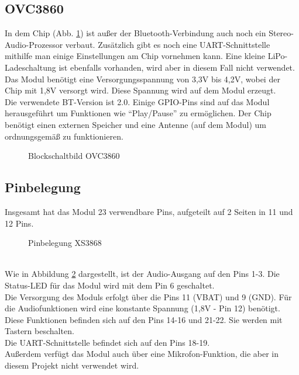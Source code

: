 \subsection{OVC3860}
In dem Chip (Abb. \ref {fig:abb2.1}) ist außer der Bluetooth-Verbindung auch noch ein Stereo-Audio-Prozessor verbaut. Zusätzlich gibt es noch eine UART-Schnittstelle mithilfe man einige Einstellungen am Chip vornehmen kann. Eine kleine LiPo-Ladeschaltung ist ebenfalls vorhanden, wird aber in diesem Fall nicht verwendet.\\
Das Modul benötigt eine Versorgungsspannung von 3,3V bis 4,2V, wobei der Chip mit 1,8V versorgt wird. Diese Spannung wird auf dem Modul erzeugt.\\
Die verwendete BT-Version ist 2.0. Einige GPIO-Pins sind auf das Modul herausgeführt um Funktionen wie \enquote{Play/Pause} zu ermöglichen. Der Chip benötigt einen externen Speicher und eine Antenne (auf dem Modul) um ordnungsgemäß zu funktionieren.
\begin{figure} [h]
	\centering
	\caption{Blockschaltbild OVC3860}\label {fig:abb2.1}
\end{figure}


\subsection{Pinbelegung}
Insgesamt hat das Modul 23 verwendbare Pins, aufgeteilt auf 2 Seiten in 11 und 12 Pins.
\begin{figure} [h]
	\centering
	\caption{Pinbelegung XS3868}\label {fig:abb2.2}
\end{figure}\\
Wie in Abbildung \ref{fig:abb2.2} dargestellt, ist der Audio-Ausgang auf den Pins 1-3. Die Status-LED für das Modul wird mit dem Pin 6 geschaltet.\\
Die Versorgung des Moduls erfolgt über die Pins 11 (VBAT) und 9 (GND). Für die Audiofunktionen wird eine konstante Spannung (1,8V - Pin 12) benötigt. Diese Funktionen befinden sich auf den Pins 14-16 und 21-22. Sie werden mit Tastern beschalten.\\
Die UART-Schnittstelle befindet sich auf den Pins 18-19.\\
Außerdem verfügt das Modul auch über eine Mikrofon-Funktion, die aber in diesem Projekt nicht verwendet wird.



